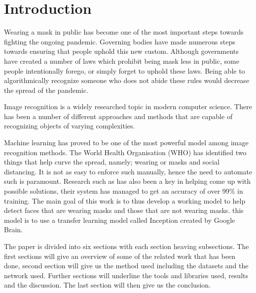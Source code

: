 \chapter{Introduction}

Wearing a mask in public has become one of the most important steps towards fighting the ongoing pandemic.
Governing bodies have made numerous steps towards ensuring that people uphold this new custom.
Although governments have created a number of laws which prohibit being mask less in public, some people intentionally forego, or simply forget to uphold these laws.
Being able to algorithmically recognize someone who does not abide these rules would decrease the spread of the pandemic.

Image recognition is a widely researched topic in modern computer science. 
There has been a number of different approaches and methods that are capable of recognizing objects of varying complexities.

Machine learning has proved to be one of the most powerful model among image recognition methods. The World Health Organisation (WHO) has identified two things that help curve the spread, namely; wearing or masks and social distancing. It is not as easy to enforce such manually, hence the need to automate such is paramount. Research such as \cite{chowdary2020face} has also been a key in helping come up with possible solutions, their system has managed to get an accuracy of over 99\% in training. The main goal of this work is to thus develop a working model to help detect faces that are wearing masks and those that are not wearing masks. this model is to use a transfer learning model called Inception created by Google Brain. 

The paper is divided into six sections with each section heaving subsections. The first sections will give an overview of some of the related work that has been done, second section will give us the method used including the datasets and the network used. Further sections will underline the tools and libraries used, results and the discussion. The last section will then give us the conclusion.


